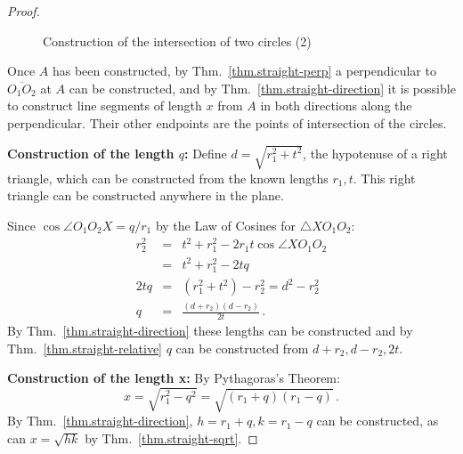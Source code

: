 \begin{proof}
\begin{figure}[ht]
\begin{center}
\end{center}
\caption{Construction of the intersection of two circles (2)}\label{f.se-circle-circle2}
\end{figure}

Once $A$ has been constructed, by Thm.~\ref{thm.straight-perp} a perpendicular to $\overline{O_1O_2}$ at $A$ can be constructed, and by Thm.~\ref{thm.straight-direction} it is possible to construct line segments of length $x$ from $A$ in both directions along the perpendicular. Their other endpoints are  the points of intersection of the circles.

\noindent\textbf{Construction of the length $q$:} Define $d=\sqrt{r_1^2+t^2}$, the hypotenuse of a right triangle, which can be constructed from the known lengths $r_1,t$. This right triangle can be constructed anywhere in the plane.

Since $\cos\angle O_1O_2X=q/r_1$ by the Law of Cosines  for $\triangle XO_1O_2$:
\begin{eqnarray*}
r_2^2 &=& t^2 + r_1^2 - 2r_1t\cos\angle XO_1O_2\\
&=& t^2 + r_1^2 - 2tq\\
2tq &=& (r_1^2+t^2) - r_2^2=d^2-r_2^2\\
q&=&\frac{(d+r_2)(d-r_2)}{2t}\,.
\end{eqnarray*}
By Thm.~\ref{thm.straight-direction} these lengths can be constructed and by Thm.~\ref{thm.straight-relative} $q$ can be constructed from $d+r_2,d-r_2,2t$.

\medskip

\noindent\textbf{Construction of the length x:} By Pythagoras's Theorem:
\[
x=\sqrt{r_1^2-q^2}=\sqrt{(r_1+q)(r_1-q)}\,.
\]
By Thm.~\ref{thm.straight-direction}, $h =r_1+ q,k= r_1 - q$ can be constructed, as can $x=\sqrt{hk}$ by Thm.~\ref{thm.straight-sqrt}.
\end{proof}

